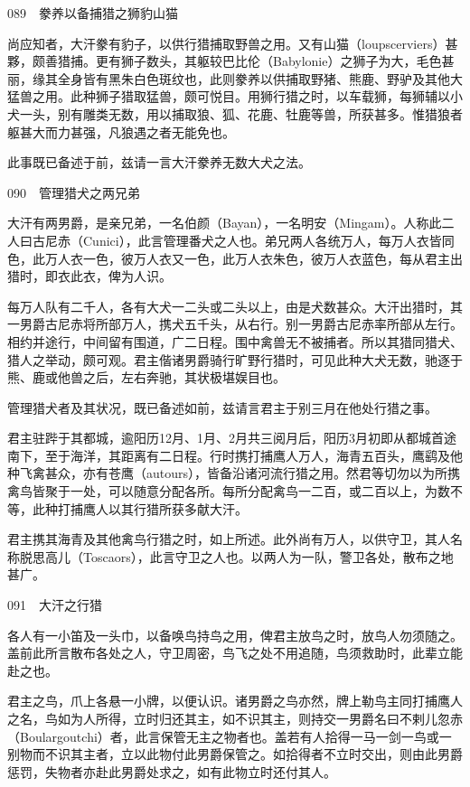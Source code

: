 \documentclass[12pt,UTF8]{ctexbook}
\begin{document}
089　豢养以备捕猎之狮豹山猫

尚应知者，大汗豢有豹子，以供行猎捕取野兽之用。又有山猫（loupscerviers）甚夥，颇善猎捕。更有狮子数头，其躯较巴比伦（Babylonie）之狮子为大，毛色甚丽，缘其全身皆有黑朱白色斑纹也，此则豢养以供捕取野猪、熊鹿、野驴及其他大猛兽之用。此种狮子猎取猛兽，颇可悦目。用狮行猎之时，以车载狮，每狮辅以小犬一头，别有雕类无数，用以捕取狼、狐、花鹿、牡鹿等兽，所获甚多。惟猎狼者躯甚大而力甚强，凡狼遇之者无能免也。

此事既已备述于前，兹请一言大汗豢养无数大犬之法。





090　管理猎犬之两兄弟

大汗有两男爵，是亲兄弟，一名伯颜（Bayan），一名明安（Mingam）。人称此二人曰古尼赤（Cunici），此言管理番犬之人也。弟兄两人各统万人，每万人衣皆同色，此万人衣一色，彼万人衣又一色，此万人衣朱色，彼万人衣蓝色，每从君主出猎时，即衣此衣，俾为人识。

每万人队有二千人，各有大犬一二头或二头以上，由是犬数甚众。大汗出猎时，其一男爵古尼赤将所部万人，携犬五千头，从右行。别一男爵古尼赤率所部从左行。相约并途行，中间留有围道，广二日程。围中禽兽无不被捕者。所以其猎同猎犬、猎人之举动，颇可观。君主偕诸男爵骑行旷野行猎时，可见此种大犬无数，驰逐于熊、鹿或他兽之后，左右奔驰，其状极堪娱目也。

管理猎犬者及其状况，既已备述如前，兹请言君主于别三月在他处行猎之事。

君主驻跸于其都城，逾阳历12月、1月、2月共三阅月后，阳历3月初即从都城首途南下，至于海洋，其距离有二日程。行时携打捕鹰人万人，海青五百头，鹰鹞及他种飞禽甚众，亦有苍鹰（autours），皆备沿诸河流行猎之用。然君等切勿以为所携禽鸟皆聚于一处，可以随意分配各所。每所分配禽鸟一二百，或二百以上，为数不等，此种打捕鹰人以其行猎所获多献大汗。

君主携其海青及其他禽鸟行猎之时，如上所述。此外尚有万人，以供守卫，其人名称脱思高儿（Toscaors），此言守卫之人也。以两人为一队，警卫各处，散布之地甚广。





091　大汗之行猎

各人有一小笛及一头巾，以备唤鸟持鸟之用，俾君主放鸟之时，放鸟人勿须随之。盖前此所言散布各处之人，守卫周密，鸟飞之处不用追随，鸟须救助时，此辈立能赴之也。

君主之鸟，爪上各悬一小牌，以便认识。诸男爵之鸟亦然，牌上勒鸟主同打捕鹰人之名，鸟如为人所得，立时归还其主，如不识其主，则持交一男爵名曰不剌儿忽赤（Boulargoutchi）者，此言保管无主之物者也。盖若有人拾得一马一剑一鸟或一别物而不识其主者，立以此物付此男爵保管之。如拾得者不立时交出，则由此男爵惩罚，失物者亦赴此男爵处求之，如有此物立时还付其人。
\end{document}
